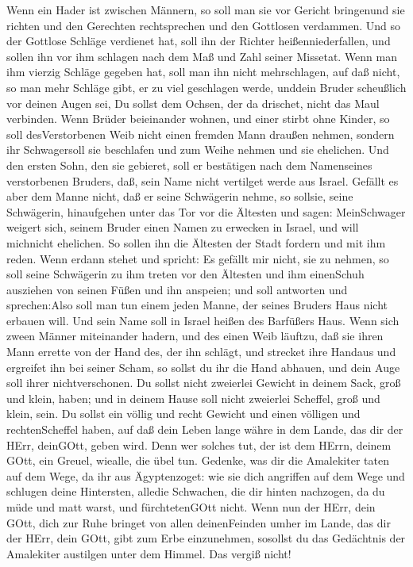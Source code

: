  Wenn ein Hader ist zwischen Männern, so soll man sie vor
Gericht bringenund sie richten und den Gerechten rechtsprechen und den
Gottlosen verdammen.  Und so der Gottlose Schläge verdienet
hat, soll ihn der Richter heißenniederfallen, und sollen ihn vor ihm
schlagen nach dem Maß und Zahl seiner Missetat.  Wenn man
ihm vierzig Schläge gegeben hat, soll man ihn nicht mehrschlagen, auf
daß nicht, so man mehr Schläge gibt, er zu viel geschlagen werde,
unddein Bruder scheußlich vor deinen Augen sei,  Du sollst
dem Ochsen, der da drischet, nicht das Maul verbinden.  Wenn
Brüder beieinander wohnen, und einer stirbt ohne Kinder, so soll
desVerstorbenen Weib nicht einen fremden Mann draußen nehmen, sondern
ihr Schwagersoll sie beschlafen und zum Weihe nehmen und sie ehelichen.
 Und den ersten Sohn, den sie gebieret, soll er bestätigen
nach dem Namenseines verstorbenen Bruders, daß, sein Name nicht
vertilget werde aus Israel.  Gefällt es aber dem Manne
nicht, daß er seine Schwägerin nehme, so sollsie, seine Schwägerin,
hinaufgehen unter das Tor vor die Ältesten und sagen: MeinSchwager
weigert sich, seinem Bruder einen Namen zu erwecken in Israel, und will
michnicht ehelichen.  So sollen ihn die Ältesten der Stadt
fordern und mit ihm reden. Wenn erdann stehet und spricht: Es gefällt
mir nicht, sie zu nehmen,  so soll seine Schwägerin zu ihm
treten vor den Ältesten und ihm einenSchuh ausziehen von seinen Füßen
und ihn anspeien; und soll antworten und sprechen:Also soll man tun
einem jeden Manne, der seines Bruders Haus nicht erbauen will.
 Und sein Name soll in Israel heißen des Barfüßers Haus.
 Wenn sich zween Männer miteinander hadern, und des einen
Weib läuftzu, daß sie ihren Mann errette von der Hand des, der ihn
schlägt, und strecket ihre Handaus und ergreifet ihn bei seiner Scham,
 so sollst du ihr die Hand abhauen, und dein Auge soll
ihrer nichtverschonen.  Du sollst nicht zweierlei Gewicht
in deinem Sack, groß und klein, haben;  und in deinem Hause
soll nicht zweierlei Scheffel, groß und klein, sein.  Du
sollst ein völlig und recht Gewicht und einen völligen und
rechtenScheffel haben, auf daß dein Leben lange währe in dem Lande, das
dir der HErr, deinGOtt, geben wird.  Denn wer solches tut,
der ist dem HErrn, deinem GOtt, ein Greuel, wiealle, die übel tun.
 Gedenke, was dir die Amalekiter taten auf dem Wege, da ihr
aus Ägyptenzoget:  wie sie dich angriffen auf dem Wege und
schlugen deine Hintersten, alledie Schwachen, die dir hinten nachzogen,
da du müde und matt warst, und fürchtetenGOtt nicht.  Wenn
nun der HErr, dein GOtt, dich zur Ruhe bringet von allen deinenFeinden
umher im Lande, das dir der HErr, dein GOtt, gibt zum Erbe einzunehmen,
sosollst du das Gedächtnis der Amalekiter austilgen unter dem Himmel.
Das vergiß nicht!

